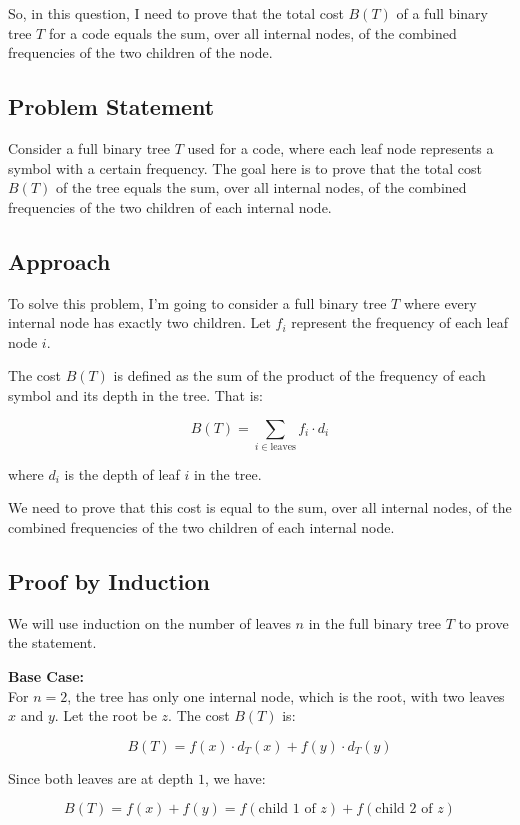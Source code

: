 \documentclass[10pt,letter,notitlepage]{article}
\begin{document}
\begin{Answer}

So, in this question, I need to prove that the total cost $B(T)$ of a full binary tree $T$ for a code equals the sum, over all internal nodes, of the combined frequencies of the two children of the node.

\subsection*{Problem Statement}
Consider a full binary tree $T$ used for a code, where each leaf node represents a symbol with a certain frequency. The goal here is to prove that the total cost $B(T)$ of the tree equals the sum, over all internal nodes, of the combined frequencies of the two children of each internal node.

\subsection*{Approach}
To solve this problem, I'm going to consider a full binary tree $T$ where every internal node has exactly two children. Let $f_i$ represent the frequency of each leaf node $i$.

The cost $B(T)$ is defined as the sum of the product of the frequency of each symbol and its depth in the tree. That is:

\[
B(T) = \sum_{i \in \text{leaves}} f_i \cdot d_i
\]

where $d_i$ is the depth of leaf $i$ in the tree.

We need to prove that this cost is equal to the sum, over all internal nodes, of the combined frequencies of the two children of each internal node.

\subsection*{Proof by Induction}
We will use induction on the number of leaves $n$ in the full binary tree $T$ to prove the statement.

\textbf{Base Case:} \\
For $n = 2$, the tree has only one internal node, which is the root, with two leaves $x$ and $y$. Let the root be $z$. The cost $B(T)$ is:

\[
B(T) = f(x) \cdot d_T(x) + f(y) \cdot d_T(y)
\]

Since both leaves are at depth $1$, we have:

\[
B(T) = f(x) + f(y) = f(\text{child 1 of } z) + f(\text{child 2 of } z)
\]


\end{Answer}
\end{document}
